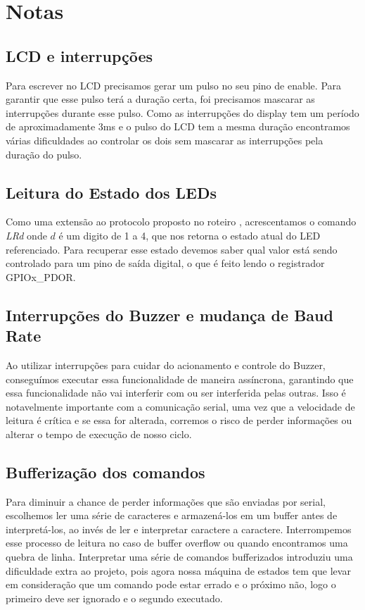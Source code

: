 \documentclass{article}
\begin{document}
\section{Notas}
\subsection{LCD e interrupções}
Para escrever no LCD precisamos gerar um pulso no seu pino de enable. Para garantir que esse pulso terá a duração certa, foi precisamos mascarar as interrupções durante esse pulso. Como as interrupções do display tem um período de aproximadamente 3ms e o pulso do LCD tem a mesma duração encontramos várias dificuldades ao controlar os dois sem mascarar as interrupções pela duração do pulso.

\subsection{Leitura do Estado dos LEDs}
Como uma extensão ao protocolo proposto no roteiro \cite{bb:roteiro}, acrescentamos o comando \textit{LRd} onde $d$ é um digito de 1 a 4, que nos retorna o estado atual do LED referenciado. Para recuperar esse estado devemos saber qual valor está sendo controlado para um pino de saída digital, o que é feito lendo o registrador GPIOx\_PDOR.

\subsection{Interrupções do Buzzer e mudança de Baud Rate}
Ao utilizar interrupções para cuidar do acionamento e controle do Buzzer, conseguímos executar essa funcionalidade de maneira assíncrona, garantindo que essa funcionalidade não vai interferir com ou ser interferida pelas outras. Isso é notavelmente importante com a comunicação serial, uma vez que a velocidade de leitura é crítica e se essa for alterada, corremos o risco de perder informações ou alterar o tempo de execução de nosso ciclo.

\subsection{Bufferização dos comandos}
Para diminuir a chance de perder informações que são enviadas por serial, escolhemos ler uma série de caracteres e armazená-los em um buffer antes de interpretá-los, ao invés de ler e interpretar caractere a caractere. Interrompemos esse processo de leitura no caso de buffer overflow ou quando encontramos uma quebra de linha. Interpretar uma série de comandos bufferizados introduziu uma dificuldade extra ao projeto, pois agora nossa máquina de estados tem que levar em consideração que um comando pode estar errado e o próximo não, logo o primeiro deve ser ignorado e o segundo executado.
\end{document}
